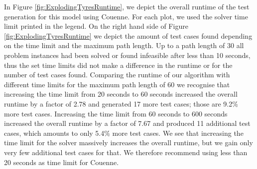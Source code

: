 \documentclass[runningheads,a4paper]{llncs}%
\newcommand{\OCLVar}[1]{\textit{#1}}
\begin{document}
In Figure \ref{fig:ExplodingTyresRuntime}, we depict the overall runtime of the test generation for this model using Couenne. For each plot, we used the solver time limit printed in the legend. On the right hand side of Figure \ref{fig:ExplodingTyresRuntime} we depict the amount of test cases found depending on the time limit and the maximum path length. Up to a path length of 30 all problem instances had been solved or found infeasible after less than 10 seconds, thus the set time limits did not make a difference in the runtime or for the number of test cases found. Comparing the runtime of our algorithm with different time limits for the maximum path length of 60 we recognise that increasing the time limit from 20 seconds to 60 seconds increased the overall runtime by a factor of 2.78 and generated 17 more test cases; those are 9.2\% more test cases. Increasing the time limit from 60 seconds to 600 seconds increased the overall runtime by a factor of 7.67 and produced 11 additional test cases, which amounts to only 5.4\% more test cases. We see that increasing the time limit for the solver massively increases the overall runtime, but we gain only very few additional %
test cases for that. We therefore recommend using less than 20 seconds as time limit for Couenne.
\end{document}
